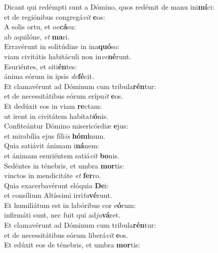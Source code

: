 \evenverse Dicant qui redémpti sunt a Dómino, quos redémit de manu ini\textbf{mí}ci:~\*\\
\evenverse et de regiónibus congregá\textit{vit} \textbf{e}os:\\
\oddverse A solis ortu, et oc\textbf{cá}su:~\*\\
\oddverse ab aquilóne, \textit{et} \textbf{ma}ri.\\
\evenverse Erravérunt in solitúdine in ina\textbf{quó}so:~\*\\
\evenverse viam civitátis habitáculi non in\textit{ve}\textbf{né}runt.\\
\oddverse Esuriéntes, et siti\textbf{én}tes:~\*\\
\oddverse ánima eórum in ipsis \textit{de}\textbf{fé}cit.\\
\evenverse Et clamavérunt ad Dóminum cum tribula\textbf{rén}tur:~\*\\
\evenverse et de necessitátibus eórum erípu\textit{it} \textbf{e}os.\\
\oddverse Et dedúxit eos in viam \textbf{re}ctam:~\*\\
\oddverse ut irent in civitátem habita\textit{ti}\textbf{ó}nis.\\
\evenverse Confiteántur Dómino misericórdiæ \textbf{e}jus:~\*\\
\evenverse et mirabília ejus fíli\textit{is} \textbf{hó}\textbf{mi}num.\\
\oddverse Quia satiávit ánimam i\textbf{ná}nem:~\*\\
\oddverse et ánimam esuriéntem satiá\textit{vit} \textbf{bo}nis.\\
\evenverse Sedéntes in ténebris, et umbra \textbf{mor}tis:~\*\\
\evenverse vinctos in mendicitáte \textit{et} \textbf{fer}ro.\\
\oddverse Quia exacerbavérunt elóquia \textbf{De}i:~\*\\
\oddverse et consílium Altíssimi irri\textit{ta}\textbf{vé}runt.\\
\evenverse Et humiliátum est in labóribus cor e\textbf{ó}rum:~\*\\
\evenverse infirmáti sunt, nec fuit qui ad\textit{ju}\textbf{vá}ret.\\
\oddverse Et clamavérunt ad Dóminum cum tribula\textbf{rén}tur:~\*\\
\oddverse et de necessitátibus eórum liberá\textit{vit} \textbf{e}os.\\
\evenverse Et edúxit eos de ténebris, et umbra \textbf{mor}tis:~\*\\
